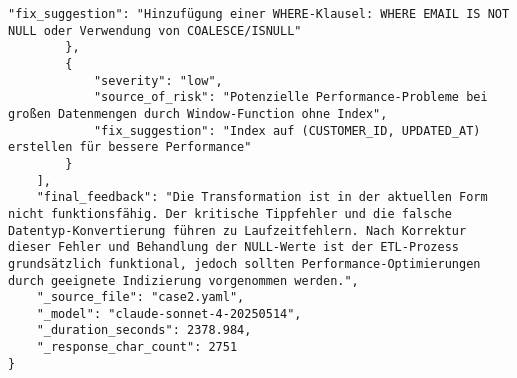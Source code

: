 \begin{lstlisting}[caption={Ausgabe: Claude Sonnet 4 Anwendungsfall 2 Robustheitsdurchlauf},label={claude_case2_prompt3}]
            "fix_suggestion": "Hinzufügung einer WHERE-Klausel: WHERE EMAIL IS NOT NULL oder Verwendung von COALESCE/ISNULL"
        },
        {
            "severity": "low",
            "source_of_risk": "Potenzielle Performance-Probleme bei großen Datenmengen durch Window-Function ohne Index",
            "fix_suggestion": "Index auf (CUSTOMER_ID, UPDATED_AT) erstellen für bessere Performance"
        }
    ],
    "final_feedback": "Die Transformation ist in der aktuellen Form nicht funktionsfähig. Der kritische Tippfehler und die falsche Datentyp-Konvertierung führen zu Laufzeitfehlern. Nach Korrektur dieser Fehler und Behandlung der NULL-Werte ist der ETL-Prozess grundsätzlich funktional, jedoch sollten Performance-Optimierungen durch geeignete Indizierung vorgenommen werden.",
    "_source_file": "case2.yaml",
    "_model": "claude-sonnet-4-20250514",
    "_duration_seconds": 2378.984,
    "_response_char_count": 2751
}
\end{lstlisting}

